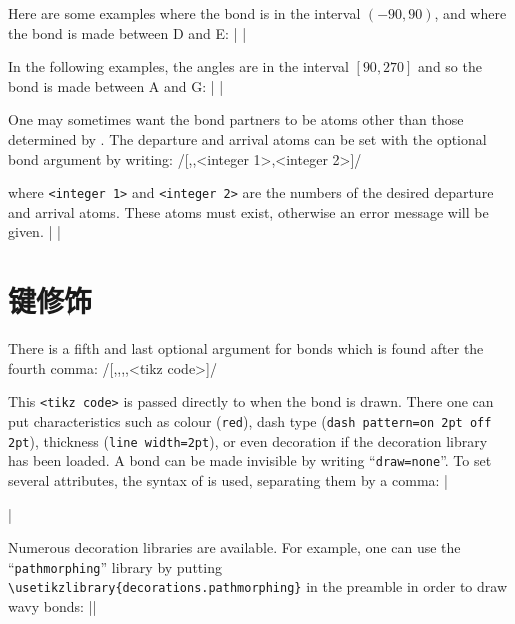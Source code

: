 \documentclass[10pt]{article}
\begin{document}
Here are some examples where the bond is in the interval $(-90,90)$, and where the bond is made between D and E:
|\quad
	\quad
	|

In the  following examples, the angles are in the interval $[90,270]$ and so the bond is made between A and G:
|\quad
	\quad
	|

One may sometimes want the bond partners to be atoms other than those determined by \CF. The departure and arrival atoms can be set with the optional bond argument by writing:
\centerverb/[,,<integer 1>,<integer 2>]/
\smallskip

where \verb-<integer 1>- and \verb-<integer 2>- are the numbers of the desired departure and arrival atoms. These atoms must exist, otherwise an error message will be given.
|\qquad
	\qquad
	|

\section{键修饰}\label{perso-liaisons}
There is a fifth and last optional argument for bonds which is found after the fourth comma:
\centerverb/[,,,,<tikz code>]/
\smallskip

This \verb-<tikz code>- is passed directly to \TIKZ when the bond is drawn. There one can put characteristics such as colour (\verb-red-), dash type (\verb-dash pattern=on 2pt off 2pt-), thickness (\verb-line width=2pt-), or even decoration if the \TIKZ decoration library has been loaded. A bond can be made invisible by writing ``\verb-draw=none-''. To set several attributes, the syntax of \TIKZ is used, separating them by a comma:
|\par
	\par
	\par
	|

Numerous \TIKZ decoration libraries are available. For example, one can use the ``\verb-pathmorphing-'' library by putting \verb-\usetikzlibrary{decorations.pathmorphing}- in the preamble in order to draw wavy bonds:
||
\end{document}

